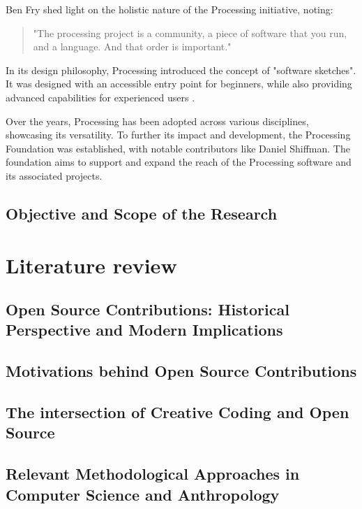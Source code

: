 \documentclass{article}
\begin{document}
Ben Fry shed light on the holistic nature of the Processing initiative, noting:
\begin{quote}
"The processing project is a community, a piece of software that you run, and a language. And that order is important."
\end{quote}
\parencite[19:22]{artsatmit2017CASTSymposium2017}

In its design philosophy, Processing introduced the concept of "software sketches". It was designed with an accessible entry point for beginners, while also providing advanced capabilities for experienced users \parencite{reasProcessingProgrammingMedia2006}.

Over the years, Processing has been adopted across various disciplines, showcasing its versatility. To further its impact and development, the Processing Foundation was established, with notable contributors like Daniel Shiffman. The foundation aims to support and expand the reach of the Processing software and its associated projects.

\subsection{Objective and Scope of the Research}


\section{Literature review}
\subsection{Open Source Contributions: Historical Perspective and Modern Implications}
\subsection{Motivations behind Open Source Contributions}
\subsection{The intersection of Creative Coding and Open Source}
\subsection{Relevant Methodological Approaches in Computer Science and Anthropology}
\end{document}
